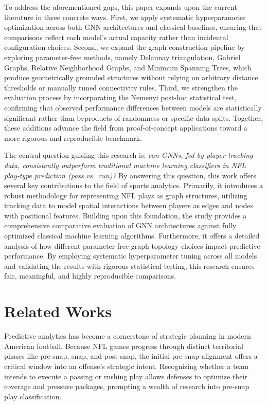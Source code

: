\documentclass[runningheads]{llncs}
\begin{document}
To address the aforementioned gaps, this paper expands upon the current literature in three concrete ways. First, we apply systematic hyperparameter optimization across both GNN architectures and classical baselines, ensuring that comparisons reflect each model's actual capacity rather than incidental configuration choices. Second, we expand the graph construction pipeline by exploring parameter-free methods, namely Delaunay triangulation, Gabriel Graphs, Relative Neighborhood Graphs, and Minimum Spanning Trees, which produce geometrically grounded structures without relying on arbitrary distance thresholds or manually tuned connectivity rules. Third, we strengthen the evaluation process by incorporating the Nemenyi post-hoc statistical test, confirming that observed performance differences between models are statistically significant rather than byproducts of randomness or specific data splits. Together, these additions advance the field from proof-of-concept applications toward a more rigorous and reproducible benchmark.

The central question guiding this research is: \textit{can GNNs, fed by player tracking data, consistently outperform traditional machine learning classifiers in NFL play-type prediction (pass vs.\ run)?} By answering this question, this work offers several key contributions to the field of sports analytics. Primarily, it introduces a robust methodology for representing NFL plays as graph structures, utilizing tracking data to model spatial interactions between players as edges and nodes with positional features. Building upon this foundation, the study provides a comprehensive comparative evaluation of GNN architectures against fully optimized classical machine learning algorithms. Furthermore, it offers a detailed analysis of how different parameter-free graph topology choices impact predictive performance. By employing systematic hyperparameter tuning across all models and validating the results with rigorous statistical testing, this research ensures fair, meaningful, and highly reproducible comparisons.


\section{Related Works}
\label{sec:related_works}

Predictive analytics has become a cornerstone of strategic planning in modern American football. Because NFL games progress through distinct territorial phases like pre-snap, snap, and post-snap, the initial pre-snap alignment offers a critical window into an offense's strategic intent. Recognizing whether a team intends to execute a passing or rushing play allows defenses to optimize their coverage and pressure packages, prompting a wealth of research into pre-snap play classification.
\end{document}

